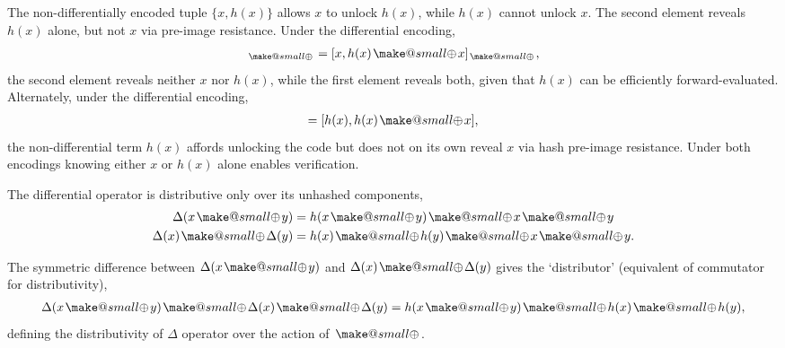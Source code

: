 \documentclass[twocolumn, aps, amsmath, amssymb, nofootinbib, superscriptaddress, longbibliography, doublefloatfix, table-of-contents, eqsecnum, rmp]{revtex4-2}
\makeatletter
\newcommand{\soplus}{{{\hspace{1pt}}{\mathbin{\mathpalette\make@small{\mathbin\oplus}}}}{\hspace{1pt}}}
\newcommand{\make@small}[2]{%
  \vcenter{\hbox{%
    \scalebox{0.6}{$\m@th#1#2$}%
  }}%
}
\makeatother
\begin{document}
The non-differentially encoded tuple $\{x,h(x)\}$ allows $x$ to unlock $h(x)$, while $h(x)$ cannot unlock $x$. The second element reveals $h(x)$ alone, but not $x$ via pre-image resistance. Under the differential encoding,
\begin{align}
	[x,\Delta(x)]_\soplus =[x,h(x)\soplus x]_\soplus,
\end{align}
the second element reveals neither $x$ nor $h(x)$, while the first element reveals both, given that $h(x)$ can be efficiently forward-evaluated. Alternately, under the differential encoding,
\begin{align}
	[h(x),\Delta(x)] = [h(x),h(x)\soplus x],
\end{align}
the non-differential term $h(x)$ affords unlocking the code but does not on its own reveal $x$ via hash pre-image resistance. Under both encodings knowing either $x$ or $h(x)$ alone enables verification.

The differential operator is distributive only over its unhashed components,
\begin{align}
	\Delta(x\soplus y) &= h(x\soplus y)\soplus x\soplus y \nonumber\\
	\Delta(x)\soplus\Delta(y) &= h(x)\soplus h(y)\soplus x\soplus y.
\end{align}





The symmetric difference between $\Delta(x\soplus y)$ and $\Delta(x)\soplus\Delta(y)$ gives the `distributor' (equivalent of commutator for distributivity),
\begin{align}
	\Delta(x\soplus y)\soplus \Delta(x)\soplus \Delta(y) = h(x\soplus y) \soplus h(x)\soplus h(y),
\end{align}
defining the distributivity of $\Delta$ operator over the action of $\soplus$.
\end{document}
